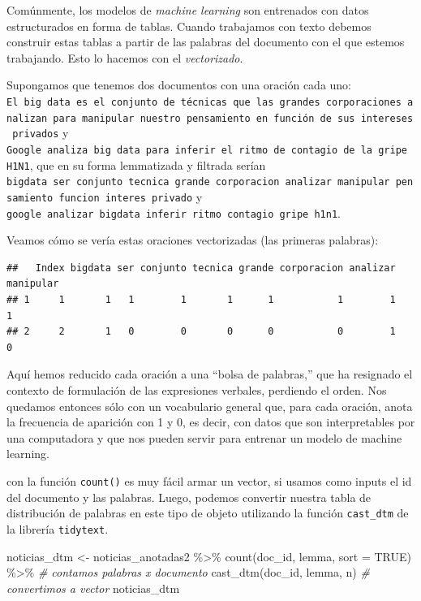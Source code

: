 \documentclass[
]{book}
\newenvironment{Shaded}{\begin{snugshade}}{\end{snugshade}}
\newcommand{\AttributeTok}[1]{\textcolor[rgb]{0.77,0.63,0.00}{#1}}
\newcommand{\CommentTok}[1]{\textcolor[rgb]{0.56,0.35,0.01}{\textit{#1}}}
\newcommand{\ConstantTok}[1]{\textcolor[rgb]{0.00,0.00,0.00}{#1}}
\newcommand{\FunctionTok}[1]{\textcolor[rgb]{0.00,0.00,0.00}{#1}}
\newcommand{\NormalTok}[1]{#1}
\newcommand{\OtherTok}[1]{\textcolor[rgb]{0.56,0.35,0.01}{#1}}
\newcommand{\SpecialCharTok}[1]{\textcolor[rgb]{0.00,0.00,0.00}{#1}}
\begin{document}
Comúnmente, los modelos de \emph{machine learning} son entrenados con datos estructurados en forma de tablas. Cuando trabajamos con texto debemos construir estas tablas a partir de las palabras del documento con el que estemos trabajando. Esto lo hacemos con el \emph{vectorizado}.

Supongamos que tenemos dos documentos con una oración cada uno: \texttt{El\ big\ data\ es\ el\ conjunto\ de\ técnicas\ que\ las\ grandes\ corporaciones\ analizan\ para\ manipular\ nuestro\ pensamiento\ en\ función\ de\ sus\ intereses\ privados} y \texttt{Google\ analiza\ big\ data\ para\ inferir\ el\ ritmo\ de\ contagio\ de\ la\ gripe\ H1N1}, que en su forma lemmatizada y filtrada serían \texttt{bigdata\ ser\ conjunto\ tecnica\ grande\ corporacion\ analizar\ manipular\ pensamiento\ funcion\ interes\ privado} y \texttt{google\ analizar\ bigdata\ inferir\ ritmo\ contagio\ gripe\ h1n1}.

Veamos cómo se vería estas oraciones vectorizadas (las primeras palabras):

\begin{verbatim}
##   Index bigdata ser conjunto tecnica grande corporacion analizar manipular
## 1     1       1   1        1       1      1           1        1         1
## 2     2       1   0        0       0      0           0        1         0
\end{verbatim}

Aquí hemos reducido cada oración a una ``bolsa de palabras,'' que ha resignado el contexto de formulación de las expresiones verbales, perdiendo el orden. Nos quedamos entonces sólo con un vocabulario general que, para cada oración, anota la frecuencia de aparición con 1 y 0, es decir, con datos que son interpretables por una computadora y que nos pueden servir para entrenar un modelo de machine learning.

con la función \texttt{count()} es muy fácil armar un vector, si usamos como inputs el id del documento y las palabras. Luego, podemos convertir nuestra tabla de distribución de palabras en este tipo de objeto utilizando la función \texttt{cast\_dtm} de la librería \texttt{tidytext}.

\begin{Shaded}
\begin{Highlighting}[]
\NormalTok{noticias\_dtm }\OtherTok{\textless{}{-}}\NormalTok{ noticias\_anotadas2 }\SpecialCharTok{\%\textgreater{}\%}
  \FunctionTok{count}\NormalTok{(doc\_id, lemma, }\AttributeTok{sort =} \ConstantTok{TRUE}\NormalTok{) }\SpecialCharTok{\%\textgreater{}\%} \CommentTok{\# contamos palabras x documento}
  \FunctionTok{cast\_dtm}\NormalTok{(doc\_id, lemma, n) }\CommentTok{\# convertimos a vector}
\NormalTok{noticias\_dtm}
\end{Highlighting}
\end{Shaded}
\end{document}
